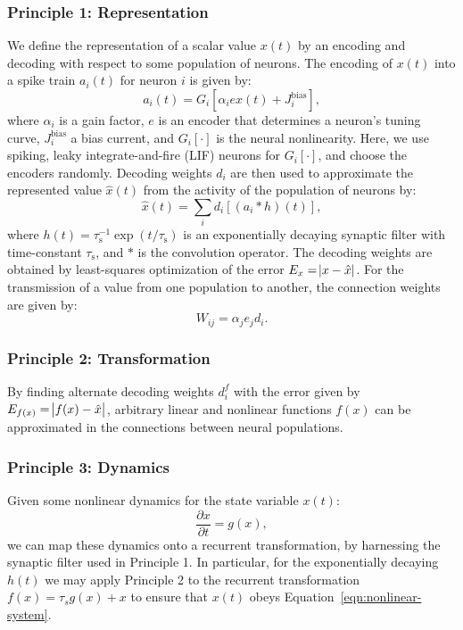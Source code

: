 \documentclass[10pt,letterpaper]{article}
\begin{document}
\subsubsection{Principle 1: Representation}
We define the representation of a scalar value $x(t)$ by an encoding and decoding with respect to some population of neurons.
The encoding of $x(t)$ into a spike train $a_i(t)$ for neuron $i$ is given by:
\begin{equation}
    a_i(t) = G_i\left[\alpha_i e x(t) + J_i^{\mathrm{bias}}\right] ,
\end{equation}
where $\alpha_i$ is a gain factor, $e$ is an encoder that determines a neuron's tuning curve, $J_i^{\mathrm{bias}}$ a bias current, and $G_i \left[ \cdot \right]$ is the neural nonlinearity.
Here, we use spiking, leaky integrate-and-fire (LIF) neurons for $G_i \left[ \cdot \right]$, and choose the encoders randomly.
Decoding weights $d_i$ are then used to approximate the represented value $\hat x(t)$ from the activity of the population of neurons by:
\begin{equation}
    \hat x(t) = \sum_i d_i \left[(a_i * h)(t)\right] ,
\end{equation}
where $h(t) = \tau_{\mathrm{s}}^{-1}\exp(t/\tau_{\mathrm{s}})$ is an exponentially decaying synaptic filter with time-constant $\tau_{\mathrm{s}}$, and $\ast$ is the convolution operator.
The decoding weights are obtained by least-squares optimization of the error $E_x = \abs{x - \hat{x}}$.
For the transmission of a value from one population to another, the connection weights are given by:
\begin{equation}
    W_{ij} = \alpha_j e_j d_i \text{.}
\end{equation}

\subsubsection{Principle 2: Transformation}
By finding alternate decoding weights $d^f_i$ with the error given by $E_{f(x)} = \abs{f(x) - \hat x}$, arbitrary linear and nonlinear functions $f(x)$ can be approximated in the connections between neural populations.

\subsubsection{Principle 3: Dynamics}
Given some nonlinear dynamics for the state variable $x(t)$:
\begin{equation} \label{eqn:nonlinear-system}
    \frac{\partial x}{\partial t} = g(x) ,
\end{equation}
we can map these dynamics onto a recurrent transformation, by harnessing the synaptic filter used in Principle 1.
In particular, for the exponentially decaying $h(t)$ we may apply Principle 2 to the recurrent transformation $f(x) = \tau_s g(x) + x$ to ensure that $x(t)$ obeys Equation~\ref{eqn:nonlinear-system}.
\end{document}
